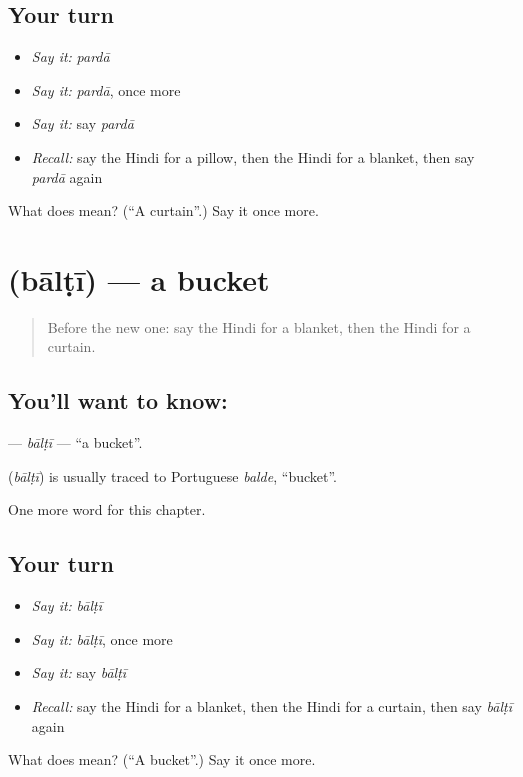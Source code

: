 \subsection*{Your turn}
\begin{itemize}
\raggedright
  \item \emph{Say it:} \emph{pardā}
  \item \emph{Say it:} \emph{pardā}, once more
  \item \emph{Say it:} say \emph{pardā}
  \item \emph{Recall:} say the Hindi for a pillow, then the Hindi for a blanket, then say \emph{pardā} again
\end{itemize}

\begin{tcolorbox}[breakable,colback=teal!4,colframe=teal!35!black,title={Before you move on}]
What does  mean? (\textquotedblleft{}A curtain\textquotedblright{}.) Say it once more.
\end{tcolorbox}
\section[\texorpdfstring{\hi{बाल्टी} (bālṭī)}{बाल्टी (bālṭī)}]{ (bālṭī) — a bucket}

\label{lesson:HI-C129-balti}



\begin{quote}
Before the new one: say the Hindi for a blanket, then the Hindi for a curtain.
\end{quote}

\subsection*{You'll want to know: }
\textbf{} — \emph{bālṭī} — \textquotedblleft{}a bucket\textquotedblright{}.

\begin{cousinweb}
\textbf{} (\emph{bālṭī}) is usually traced to Portuguese \emph{balde}, \textquotedblleft{}bucket\textquotedblright{}.
\end{cousinweb}

\begin{grammarlens}[title={What you've built}]
One more word for this chapter.
\end{grammarlens}

\subsection*{Your turn}
\begin{itemize}
\raggedright
  \item \emph{Say it:} \emph{bālṭī}
  \item \emph{Say it:} \emph{bālṭī}, once more
  \item \emph{Say it:} say \emph{bālṭī}
  \item \emph{Recall:} say the Hindi for a blanket, then the Hindi for a curtain, then say \emph{bālṭī} again
\end{itemize}

\begin{tcolorbox}[breakable,colback=teal!4,colframe=teal!35!black,title={Before you move on}]
What does  mean? (\textquotedblleft{}A bucket\textquotedblright{}.) Say it once more.
\end{tcolorbox}
